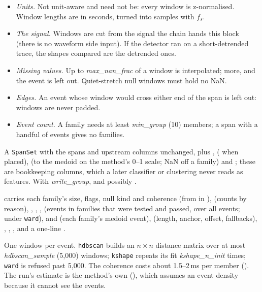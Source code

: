 \begin{itemize}
\item \emph{Units.} Not unit-aware and need not be: every window is z-normalised. Window
  lengths are in seconds, turned into samples with $f_s$.
\item \emph{The signal.} Windows are cut from the signal the chain hands this block (there
  is no waveform side input). If the detector ran on a short-detrended trace, the shapes
  compared are the detrended ones.
\item \emph{Missing values.} Up to \emph{max\_nan\_frac} of a window is interpolated; more,
  and the event is left out. Quiet-stretch null windows must hold no NaN.
\item \emph{Edges.} An event whose window would cross either end of the span is left out:
  windows are never padded.
\item \emph{Event count.} A family needs at least \emph{min\_group} (10) members; a span with
  a handful of events gives no families.
\end{itemize}

A \texttt{SpanSet} with the spans and upstream columns unchanged, plus ,
 ( when placed),  (to the medoid on
the method's 0--1 scale; NaN off a family) and ; these are
bookkeeping columns, which a later classifier or clustering never reads as features. With
\emph{write\_group},  and possibly .

 carries each family's size, flags, null kind and coherence (from
 in ),  (counts by
reason), , , ,
 (events in families that were tested and passed, over all
events;  under \texttt{ward}),  and  (each
family's medoid event),  (length, anchor, offset, fallbacks), ,
, ,  and a one-line .

One window per event. \texttt{hdbscan} builds an $n\times n$ distance matrix over at most
\emph{hdbscan\_sample} (5{,}000) windows; \texttt{kshape} repeats its fit
\emph{kshape\_n\_init} times; \texttt{ward} is refused past 5{,}000. The coherence costs about
1.5--2\,ms per member (). The run's estimate is the
method's own (), which assumes an event density because it cannot see the
events.

